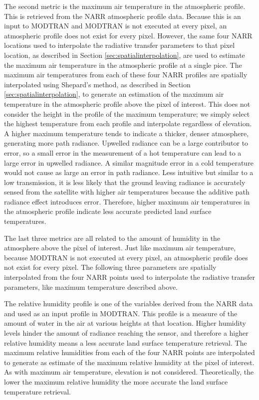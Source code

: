 \documentclass{book}
\begin{document}
The second metric is the maximum air temperature in the atmospheric profile.  This is retrieved from the NARR atmospheric profile data.  Because this is an input to MODTRAN and MODTRAN is not executed at every pixel, an atmospheric profile does not exist for every pixel.  However, the same four NARR locations used to interpolate the radiative transfer parameters to that pixel location, as described in Section \ref{sec:spatialinterpolation}, are used to estimate the maximum air temperature in the atmospheric profile at a single pice.  The maximum air temperatures from each of these four NARR profiles are spatially interpolated using Shepard's method, as described in Section \ref{sec:spatialinterpolation}, to generate an estimation of the maximum air temperature in the atmospheric profile above the pixel of interest.  This does not consider the height in the profile of the maximum temperature; we simply select the highest temperature from each profile and interpolate regardless of elevation.  A higher maximum temperature tends to indicate a thicker, denser atmosphere, generating more path radiance.  Upwelled radiance can be a large contributor to error, so a small error in the measurement of a hot temperature can lead to a large error in upwelled radiance.  A similar magnitude error in a cold temperature would not cause as large an error in path radiance.  Less intuitive but similar to a low transmission, it is less likely that the ground leaving radiance is accurately sensed from the satellite with higher air temperatures because the additive path radiance effect introduces error.  Therefore, higher maximum air temperatures in the atmospheric profile indicate less accurate predicted land surface temperatures.

The last three metrics are all related to the amount of humidity in the atmosphere above the pixel of interest.  Just like maximum air temperature, because MODTRAN is not executed at every pixel, an atmospheric profile does not exist for every pixel.  The following three parameters are spatially interpolated from the four NARR points used to interpolate the radiative transfer parameters, like maximum temperature described above.

The relative humidity profile is one of the variables derived from the NARR data and used as an input profile in MODTRAN.  This profile is a measure of the amount of water in the air at various heights at that location.  Higher humidity levels hinder the amount of radiance reaching the sensor, and therefore a higher relative humidity means a less accurate land surface temperature retrieval.  The maximum relative humidities from each of the four NARR points are interpolated to generate as estimate of the maximum relative humidity at the pixel of interest.  As with maximum air temperature, elevation is not considered.  Theoretically, the lower the maximum relative humidity the more accurate the land surface temperature retrieval.  
\end{document}
